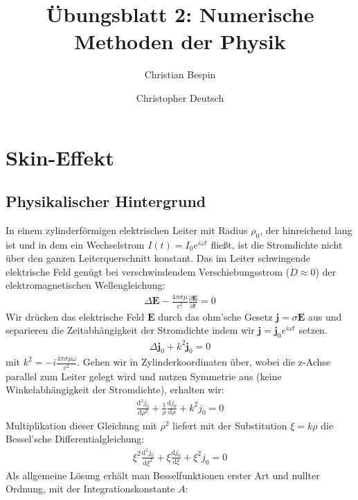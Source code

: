 \documentclass[10pt,a4paper]{article}
\author{Christian Bespin \and Christopher Deutsch}
\title{Übungsblatt 2: Numerische Methoden der Physik}
\begin{document}
\maketitle

\setcounter{section}{1}

\section{Skin-Effekt}

\subsection{Physikalischer Hintergrund}

In einem zylinderförmigen elektrischen Leiter mit Radius $\rho_0$, der hinreichend lang ist und in dem ein Wechselstrom $I(t)=I_0 e^{i \omega t}$ fließt, ist die Stromdichte nicht über den ganzen Leiterquerschnitt konstant. Das im Leiter schwingende elektrische Feld genügt bei verschwindendem Verschiebungsstrom ($\dot D \approx 0$) der elektromagnetischen Wellengleichung:
\begin{align}
	\Delta\mathbf{E} - \frac{4\pi\sigma\mu}{c^2} \frac{\partial \mathbf{E}}{\partial t} = 0
	\label{eq:maxwellgleichung}
\end{align}
Wir drücken das elektrische Feld $\mathbf{E}$ durch das ohm'sche Gesetz $\mathbf{j} = \sigma \mathbf{E}$ aus und separieren die Zeitabhängigkeit der Stromdichte \cite{healdmarion} indem wir $\mathbf{j} = \mathbf{j}_0 e^{i \omega t}$ setzen.
\begin{align}
	\Delta\mathbf{j}_0 + k^2 \mathbf{j}_0 = 0
	\label{eq:maxwellgleichungJ}
\end{align}
mit $k^2 = - i \frac{4 \pi \sigma \mu \omega}{c^2}$. Gehen wir in Zylinderkoordinaten über, wobei die z-Achse parallel zum Leiter gelegt wird und nutzen Symmetrie aus (keine Winkelabhängigkeit der Stromdichte), erhalten wir:
\begin{align}
	\frac{\mathrm{d}^2 j_0}{\mathrm{d}\rho^2} + \frac{1}{\rho}\frac{\mathrm{d}j_0}{\mathrm{d}\rho} + k^2 j_0 = 0
	\label{eq:besseldgl} 
\end{align}
Multiplikation dieser Gleichung mit $\rho^2$ liefert mit der Substitution $\xi = k \rho$ die Bessel'sche Differentialgleichung:
\begin{align}
  \xi^2 \frac{\mathrm{d}^2j_0}{\mathrm{d}\xi^2} + \xi \frac{\mathrm{d}j_0}{\mathrm{d}\xi} + \xi^2 j_0 = 0
\end{align}
Als allgemeine Lösung erhält man Besselfunktionen erster Art und nullter Ordnung, mit der Integrationskonstante $A$:
\end{document}
